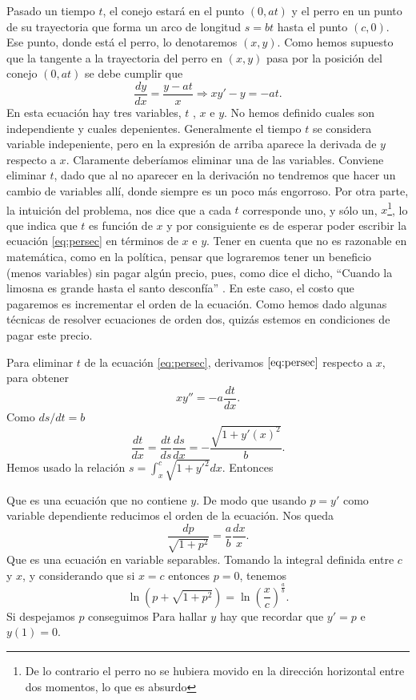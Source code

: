 Pasado un tiempo $t$, el conejo estará en el punto $(0,at)$ y el perro en un punto de su trayectoria que forma un arco de
 longitud $s=bt$ hasta el punto $(c,0)$. Ese punto, donde está el perro, lo denotaremos $(x,y)$. Como hemos supuesto que la tangente a la trayectoria del perro en $(x,y)$ pasa
 por la posición del conejo $(0,at)$ se debe cumplir que
 \begin{equation}\label{eq:persec}\frac{dy}{dx}=\frac{y-at}{x}\Longrightarrow xy'-y=-at.\end{equation}
 En esta ecuación hay tres variables, $t$ , $x$ e $y$. No hemos definido cuales 
 son independiente y cuales depenientes.   Generalmente el tiempo $t$ se considera  
 variable  indepeniente, pero en la expresión de arriba aparece la derivada de $y$ 
 respecto a $x$.
 Claramente deberíamos eliminar una de las variables. Conviene eliminar $t$, dado que 
 al no aparecer en la derivación no tendremos que hacer un cambio de variables allí, 
 donde siempre es un poco más engorroso.   Por otra parte, la intuición del problema, 
 nos dice que  a cada $t$ corresponde uno, y sólo un, $x$\footnote{De lo contrario el 
 perro no se hubiera movido en la dirección horizontal entre dos momentos, lo que es absurdo}, lo que indica que $t$ es función de $x$ y por consiguiente es de esperar poder escribir la ecuación \eqref{eq:persec} en términos de $x$ e $y$.   Tener en cuenta que no es  razonable en matemática, como en la política,  pensar que lograremos tener un beneficio (menos variables) sin pagar algún precio, pues, como dice el dicho,
 ``Cuando la limosna es grande hasta el santo desconfía'' .
 En este caso, el costo que pagaremos
 es incrementar el orden de la ecuación.
 Como hemos dado algunas técnicas de  resolver ecuaciones de orden dos, quizás estemos en condiciones de pagar este precio.

Para eliminar $t$ de la ecuación \eqref{eq:persec}, derivamos $\eqref{eq:persec}$ respecto a $x$, para obtener
\[xy''=-a\frac{dt}{dx}.\]
Como $ds/dt=b$
\[\frac{dt}{dx}=\frac{dt}{ds}\frac{ds}{dx}=-\frac{\sqrt{1+y'(x)^2}}{b}.\]
Hemos usado la relación $s=\int_x^c\sqrt{1+y'^2}dx$.
 Entonces

Que es una ecuación que no contiene $y$. De modo que usando $p=y'$ como variable dependiente reducimos el orden de la ecuación. Nos queda
\[\frac{dp}{\sqrt{1+p^2}}=\frac{a}{b}\frac{dx}{x}.\]
Que es una ecuación en variable separables. Tomando la integral definida entre $c$ y $x$, y considerando que si $x=c$ entonces $p=0$, tenemos
\[\ln\left(p+\sqrt{1+p^2}\right)=\ln\left( \frac{x}{c}\right)^{\tfrac{a}{b}}.\]
 Si despejamos $p$ conseguimos
Para hallar $y$ hay que recordar que $y'=p$ e $y(1)=0$.

